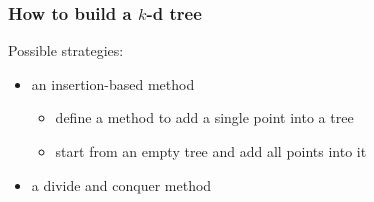 \documentclass[12pt,dvipdfmx]{beamer}
\newcommand{\mura}[1]{{\color{purple}#1}}
\newcommand{\ao}[1]{{\color{blue}#1}}
\begin{document}
\begin{frame}
\frametitle{How to build a $k$-d tree}
Possible strategies:

\begin{itemize}
\item<1->an insertion-based method
  \begin{itemize}
  \item define a method to add a single point into a tree
  \item start from an empty tree and add all points into it
  \end{itemize}

\item<2->\ao{a divide and conquer method}
\end{itemize}
\end{frame}

\end{document}
